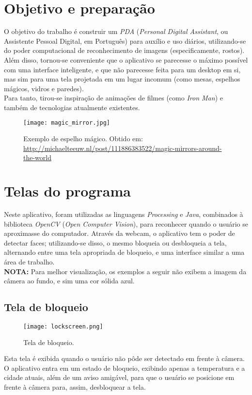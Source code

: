 \documentclass[oneside,a4paper]{abntex2}       %
\begin{document}
\imprimircapa

\chapter{Objetivo e preparação}
O objetivo do trabalho é construir um \textit{PDA} (\textit{Personal Digital Assistant}, ou Assistente Pessoal Digital, em Português) para auxílio e uso diários, utilizando-se do poder computacional de reconhecimento de imagens (especificamente, rostos). Além disso, tornou-se conveniente que o aplicativo se parecesse o máximo possível com uma interface inteligente, e que não parecesse feita para um desktop em si, mas sim para uma tela projetada em um lugar incomum (como mesas, espelhos mágicos, vidros e paredes).\\
Para tanto, tirou-se inspiração de animações de filmes (como \textit{Iron Man}) e também de tecnologias atualmente existentes.
\begin{figure}[H]
\centering
\texttt{[image: magic\_mirror.jpg]}
\caption{Exemplo de espelho mágico. Obtido em: \url{http://michaelteeuw.nl/post/111886383522/magic-mirrors-around-the-world}}
\end{figure}
\chapter{Telas do programa}
Neste aplicativo, foram utilizadas as linguagens \textit{Processing} e \textit{Java}, combinados à biblioteca \textit{OpenCV} (\textit{Open Computer Vision}), para reconhecer quando o usuário se aproximasse do computador. Através da webcam, o aplicativo tem o poder de detectar faces; utilizando-se disso, o mesmo bloqueia ou desbloqueia a tela, alternando entre uma tela apropriada de bloqueio, e uma interface similar a uma área de trabalho.\\
\textbf{NOTA:} Para melhor visualização, os exemplos a seguir não exibem a imagem da câmera ao fundo, e sim uma cor sólida azul.

\section{Tela de bloqueio}
\begin{figure}[H]
\centering
\texttt{[image: lockscreen.png]}
\caption{Tela de bloqueio.}
\end{figure}

Esta tela é exibida quando o usuário não pôde ser detectado em frente à câmera.\\
O aplicativo entra em um estado de bloqueio, exibindo apenas a temperatura e a cidade atuais, além de um aviso amigável, para que o usuário se posicione em frente à câmera para, assim, desbloquear a tela.
\end{document}
